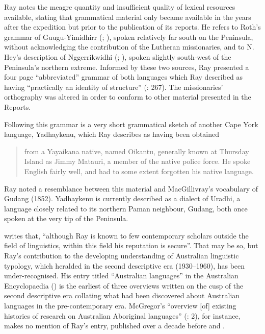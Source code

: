 Ray notes the meagre quantity and insufficient quality of lexical resources available, stating that grammatical material only became available in the years after the expedition but prior to the publication of its reports. He refers to Roth’s grammar of Guugu-Yimidhirr (\citeyear{roth_structure_1901}; ), spoken relatively far south on the Peninsula, without acknowledging the contribution of the Lutheran missionaries, and to N. Hey’s description of Nggerrikwidhi (\citealt{hey_elementary_1903}; ), spoken slightly south-west of the Peninsula’s northern extreme. Informed by these two sources, Ray presented a four page “abbreviated” grammar of both languages which Ray described as having “practically an identity of structure” (\citeyear{ray_linguistics_1907}: 267). The missionaries' orthography was altered in order to conform to other material presented in the Reports.

Following this grammar is a very short grammatical sketch of another Cape York language, Yadhaykenu, which Ray describes as having been obtained


\begin{quote}
from a Yayaikana native, named Oikantu, generally known at Thursday Island as Jimmy Matauri, a member of the native police force. He spoke English fairly well, and had to some extent forgotten his native language.
\end{quote}

Ray noted a resemblance between this material and MacGillivray’s vocabulary of Gudang (1852). Yadhaykenu is currently described as a dialect of Uradhi, a language closely related to its northern Paman neighbour, Gudang, both once spoken at the very tip of the Peninsula.

\citet[181]{shnukal_at_1998} writes that, “although Ray is known to few contemporary scholars outside the field of linguistics, within this field his reputation is secure”. That may be so, but Ray’s contribution to the developing understanding of Australian linguistic typology, which heralded in the second descriptive era (1930–1960), has been under-recognised. His entry titled “Australian languages” in the Australian Encyclopaedia (\citealt[2--15]{ray_aboriginal_1925}) is the earliest of three overviews written on the cusp of the second descriptive era collating what had been discovered about Australian languages in the pre-contemporary era. McGregor’s “overview [of] existing histories of research on Australian Aboriginal languages” (\citeyear{mcgregor_missionary_2008}: 2), for instance, makes no mention of Ray’s entry, published over a decade before \citet{capell_structure_1937} and \citet{elkin_nature_1937}.
